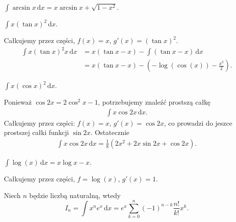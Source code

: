 \begin{integralsolved}
    $\int \arcsin x \,\mathrm{d} x = x \arcsin x + \sqrt{1-x^2}$.
\end{integralsolved}

\begin{integral}
    $\int x (\tan x)^2 \,\mathrm{d} x$.
\end{integral}

\begin{solution}
    Całkujemy przez części, $f(x) = x$, $g'(x) = (\tan x)^2$.
    \begin{align}
        \int x (\tan x)^2 x \, \mathrm{d} x & = x (\tan x - x) - \int (\tan x - x) \,\mathrm{d}x \\
        & = x (\tan x - x) - \left(-\log(\cos(x)) - \frac{x^2}{2}\right).
    \end{align}
\end{solution}

\begin{integral}
    $\int x (\cos x)^2 \,\mathrm{d} x$.
\end{integral}

\begin{solution}
    Ponieważ $\cos 2x = 2 \cos^2 x - 1$, potrzebujemy znaleźć prostszą całkę 
    \begin{align}
        \int x \cos 2x \, \mathrm{d} x.
    \end{align}
    Całkujemy przez części: $f(x) = x$, $g'(x) = \cos 2x$, co prowadzi do jeszce prostszej całki funkcji $\sin 2x$.
    Ostatecznie
    \begin{align}
        \int x \cos 2x \, \mathrm{d} x = \frac 1 8 \left(2x^2 + 2x \sin 2x + \cos 2x\right).
    \end{align}
\end{solution}

\begin{integral}
    $\int \log(x) \,\mathrm{d}x = x\log x - x$.
\end{integral}

\begin{solution}
    Całkujemy przez części, $f = \log(x)$, $g'(x) = 1$.
\end{solution}

\begin{integral}
    Niech $n$ będzie liczbą naturalną, wtedy
    \begin{equation}
        I_n = \int x^n e^x \,\mathrm{d} x = e^x \sum_{k=0}^n (-1)^{n-k} \frac{n!}{k!}x^k.
    \end{equation}
\end{integral}

